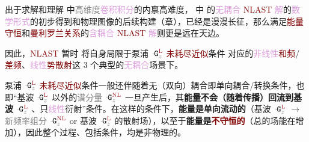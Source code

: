 出于求解和理解  中\textcolor{gray}{高维度}\textcolor{Plum}{卷积积分}的内禀高难度， 中  的\textcolor{Plum}{无耦合} \textcolor{Maroon}{NLAST} \textcolor{Plum}{解}的\textcolor{Plum}{数学形式}的初步得到和\textcolor{NavyBlue}{物理图像}的后续构建（章），已经是漫漫长征，那么满足\textcolor{Maroon}{能量守恒}和\textcolor{Maroon}{曼利罗兰关系}\cite{boydNonlinearOptics2019}的\textcolor{Plum}{含耦合} \textcolor{Maroon}{NLAST} \textcolor{Plum}{解}则更是远在天边。

因此，\textcolor{Maroon}{NLAST} 暂时 将自身局限于\textcolor{NavyBlue}{泵浦} $\xint{\mathcolor{gray}{-}}{16}{\mathtt{G}}^{\text{\textcolor{Maroon}{L}}}_{\mathcolor{gray}{z}}$ \textcolor{Maroon}{未耗尽近似}条件  对应的\textcolor{Plum}{非线性}\textcolor{Maroon}{和频}/\textcolor{Maroon}{差频}、\textcolor{Plum}{线性}\textcolor{Maroon}{势散射}这 3 个典型的\textcolor{Plum}{无耦合}场景下。 %

\textcolor{NavyBlue}{泵浦} $\xint{\mathcolor{gray}{-}}{16}{\mathtt{G}}^{\text{\textcolor{Maroon}{L}}}_{\mathcolor{gray}{z}}$ \textcolor{Maroon}{未耗尽近似}条件一般还伴随着\textcolor{NavyBlue}{无（双向）耦合}即\textcolor{NavyBlue}{单向耦合}/\textcolor{NavyBlue}{转换}条件，也即“\textcolor{NavyBlue}{基波} $\xint{\mathcolor{gray}{-}}{16}{\mathtt{G}}^{\text{\textcolor{Maroon}{L}}}_{\mathcolor{gray}{z}}$ 以外的\textcolor{gray}{谱分量} $\xint{\mathcolor{gray}{-}}{16}{\mathtt{G}}^{\text{\textcolor{Maroon}{NL}}}_{\mathcolor{gray}{z}}$ 一旦产生后，其\textbf{\textcolor{NavyBlue}{能量}不会（随着传播）\textcolor{NavyBlue}{回流}到\textcolor{NavyBlue}{基波} $\xint{\mathcolor{gray}{-}}{16}{\mathtt{G}}^{\text{\textcolor{Maroon}{L}}}_{\mathcolor{gray}{z}}$ }、只\textcolor{Plum}{线性}\textcolor{NavyBlue}{衍射}”条件。在这样的条件下，\textbf{\textcolor{NavyBlue}{能量}是\textcolor{NavyBlue}{单向流动的}}（\textcolor{NavyBlue}{基波} $\xint{\mathcolor{gray}{-}}{16}{\mathtt{G}}^{\text{\textcolor{Maroon}{L}}}_{\mathcolor{gray}{z}}$  $\to$ \textcolor{gray}{新频率组分} $\xint{\mathcolor{gray}{-}}{16}{\mathtt{G}}^{\text{\textcolor{Maroon}{NL}}}_{\mathcolor{gray}{z}}$  or \textcolor{NavyBlue}{基波} $\xint{\mathcolor{gray}{-}}{16}{\mathtt{G}}^{\text{\textcolor{Maroon}{L}}}_{\mathcolor{gray}{z}}$ 的\textcolor{NavyBlue}{散射场}），以至于\textbf{\textcolor{NavyBlue}{能量}是\textcolor{Maroon}{不守恒的}}（总的\textcolor{NavyBlue}{场能}在增加），因此整个过程、包括条件，均是\textcolor{NavyBlue}{非物理的}。

